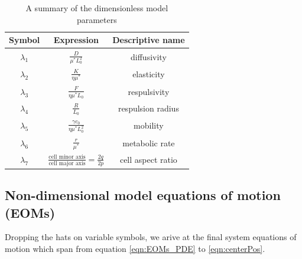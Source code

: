 \begin{table}[!htb]
\begin{center}
    \begin{tabular}{ |c|c|c| } 
     \hline
      \textbf{Symbol} & \textbf{Expression} & \textbf{Descriptive name} \\ 
      \hline
     $\lambda_1$ & $\frac{D}{ \mu^* L_0^2}$ & diffusivity \\ 
     $\lambda_2$ & $\frac{K}{ \eta \mu^*}$ & elasticity \\ 
     $\lambda_3$ & $\frac{F}{  \eta \mu^* L_0}$ & respulsivity \\ 
     $\lambda_4$ & $\frac{R}{L_0}$ & respulsion radius \\ 
     $\lambda_5$ & $\frac{\gamma c_0}{ \eta \mu^* L_0^2}$ & mobility \\ 
     $\lambda_6$ & $\frac{r}{\mu^*}$ & metabolic rate \\ 
     $\lambda_7$ & $\frac{\textrm{cell minor axis}}{\textrm{cell major axis}} = \frac{2q}{2p}$ & cell aspect ratio \\ 
     \hline
     
    \end{tabular}
    
\end{center}
\caption{A summary of the dimensionless model parameters}
\label{table:VariableNames}
\end{table}


\subsection{Non-dimensional model equations of motion (EOMs)}

Dropping the hats on variable symbols, we arive at the final system equations of motion which
span from equation \ref{eqn:EOMs_PDE} to \ref{eqn:centerPos}.



